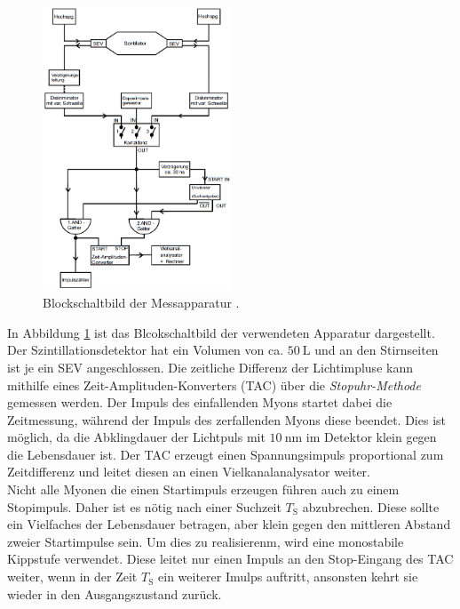 \begin{figure}
	\centering
	\includegraphics[width = 0.5\textwidth]{pic/schaltung.png}
	\caption{Blockschaltbild der Messapparatur \cite{anleitung}.}
	\label{schaltung}
\end{figure}

In Abbildung \ref{schaltung} ist das Blcokschaltbild der verwendeten Apparatur dargestellt.
Der Szintillationsdetektor hat ein Volumen von ca. $\SI{50}{\liter}$ und an den Stirnseiten ist je ein SEV angeschlossen.
Die zeitliche Differenz der Lichtimpluse kann mithilfe eines Zeit-Amplituden-Konverters (TAC) über die \textit{Stopuhr-Methode} gemessen werden.
Der Impuls des einfallenden Myons startet dabei die Zeitmessung, während der Impuls des zerfallenden Myons diese beendet.
Dies ist möglich, da die Abklingdauer der Lichtpuls mit $\SI{10}{\nano\meter}$ im Detektor klein gegen die Lebensdauer ist.
Der TAC erzeugt einen Spannungsimpuls proportional zum Zeitdifferenz und leitet diesen an einen Vielkanalanalysator weiter.\\

Nicht alle Myonen die einen Startimpuls erzeugen führen auch zu einem Stopimpuls.
Daher ist es nötig nach einer Suchzeit $T_\text{S}$ abzubrechen.
Diese sollte ein Vielfaches der Lebensdauer betragen, aber klein gegen den mittleren Abstand zweier Startimpulse sein.
Um dies zu realisierenm, wird eine monostabile Kippstufe verwendet.
Diese leitet nur einen Impuls an den Stop-Eingang des TAC weiter, wenn in der Zeit $T_\text{S}$ ein weiterer Imulps auftritt, ansonsten kehrt sie wieder in den Ausgangszustand zurück.

